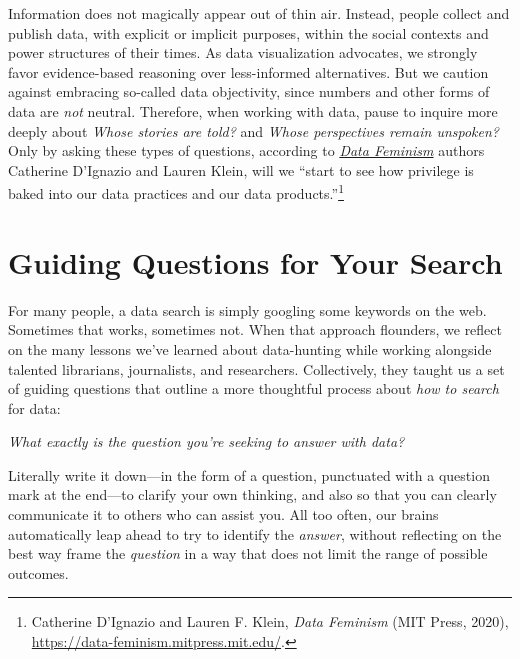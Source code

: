\documentclass[
  english,
]{book}
\begin{document}
Information does not magically appear out of thin air. Instead, people collect and publish data, with explicit or implicit purposes, within the social contexts and power structures of their times. As data visualization advocates, we strongly favor evidence-based reasoning over less-informed alternatives. But we caution against embracing so-called data objectivity, since numbers and other forms of data are \emph{not} neutral. Therefore, when working with data, pause to inquire more deeply about \emph{Whose stories are told?} and \emph{Whose perspectives remain unspoken?} Only by asking these types of questions, according to \emph{\href{https://data-feminism.mitpress.mit.edu/}{Data Feminism}} authors Catherine D'Ignazio and Lauren Klein, will we ``start to see how privilege is baked into our data practices and our data products.''\footnote{Catherine D'Ignazio and Lauren F. Klein, \emph{Data {Feminism}} ({MIT Press}, 2020), \url{https://data-feminism.mitpress.mit.edu/}.}

\hypertarget{guiding}{%
\section*{Guiding Questions for Your Search}\label{guiding}}

For many people, a data search is simply googling some keywords on the web. Sometimes that works, sometimes not. When that approach flounders, we reflect on the many lessons we've learned about data-hunting while working alongside talented librarians, journalists, and researchers. Collectively, they taught us a set of guiding questions that outline a more thoughtful process about \emph{how to search} for data:

\emph{What exactly is the question you're seeking to answer with data?}

Literally write it down---in the form of a question, punctuated with a question mark at the end---to clarify your own thinking, and also so that you can clearly communicate it to others who can assist you. All too often, our brains automatically leap ahead to try to identify the \emph{answer}, without reflecting on the best way frame the \emph{question} in a way that does not limit the range of possible outcomes.
\end{document}
